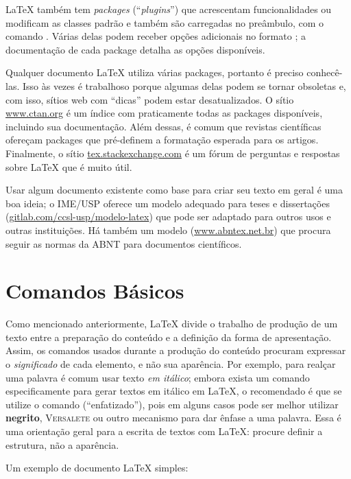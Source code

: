 \LaTeX{} também tem \emph{packages} (``\emph{plugins}'') que acrescentam
funcionalidades ou modificam as classes padrão e também são carregadas no
preâmbulo, com o comando . Várias
delas podem receber opções adicionais no formato
; a documentação
de cada package detalha as opções disponíveis.

Qualquer documento \LaTeX{} utiliza várias packages, portanto é preciso
conhecê-las. Isso às vezes é trabalhoso porque algumas delas podem se
tornar obsoletas e, com isso, sítios web com ``dicas'' podem estar
desatualizados. O sítio \url{www.ctan.org} é um índice com praticamente
todas as packages disponíveis, incluindo sua documentação. Além dessas,
é comum que revistas científicas ofereçam packages que pré-definem a
formatação esperada para os artigos. Finalmente, o sítio
\url{tex.stackexchange.com} é um fórum de perguntas e respostas sobre
\LaTeX{} que é muito útil.

Usar algum documento existente como base para criar seu texto em geral é
uma boa ideia; o IME/USP oferece um modelo adequado para teses e
dissertações (\url{gitlab.com/ccsl-usp/modelo-latex}) que pode ser
adaptado para outros usos e outras instituições. Há também um modelo
(\url{www.abntex.net.br}) que procura seguir as normas da ABNT para
documentos científicos.

\section{Comandos Básicos}
\label{sec:basico}

Como mencionado anteriormente, \LaTeX{} divide o trabalho de produção
de um texto entre a preparação do conteúdo e a definição da forma de
apresentação. Assim, os comandos usados durante a produção do conteúdo
procuram expressar o \emph{significado} de cada elemento, e não sua
aparência. Por exemplo, para realçar uma palavra é comum usar texto
\textit{em itálico}; embora exista um comando especificamente para gerar
textos em itálico em \LaTeX{}, o recomendado é que se utilize o comando
 (``enfatizado''), pois em alguns casos pode ser melhor
utilizar \textbf{negrito}, \textsc{Versalete} ou outro mecanismo para
dar ênfase a uma palavra. Essa é uma orientação geral para a escrita de
textos com \LaTeX{}: procure definir a estrutura, não a aparência.

Um exemplo de documento \LaTeX{} simples:

